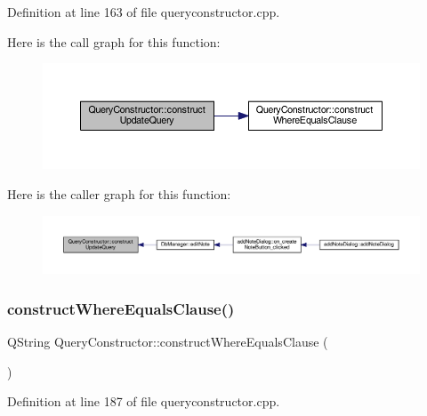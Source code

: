 Definition at line 163 of file queryconstructor.\+cpp.

Here is the call graph for this function\+:
\nopagebreak
\begin{figure}[H]
\begin{center}
\leavevmode
\includegraphics[width=350pt]{classQueryConstructor_ab17ea91cdd25440b863775526018da22_cgraph}
\end{center}
\end{figure}
Here is the caller graph for this function\+:
\nopagebreak
\begin{figure}[H]
\begin{center}
\leavevmode
\includegraphics[width=350pt]{classQueryConstructor_ab17ea91cdd25440b863775526018da22_icgraph}
\end{center}
\end{figure}
\hypertarget{classQueryConstructor_a7c864e227c2e76cc40a887314d43a0fe}{}\label{classQueryConstructor_a7c864e227c2e76cc40a887314d43a0fe} 
\subsubsection{\texorpdfstring{construct\+Where\+Equals\+Clause()}{constructWhereEqualsClause()}}
{\footnotesize\ttfamily Q\+String Query\+Constructor\+::construct\+Where\+Equals\+Clause (\begin{DoxyParamCaption}{ }\end{DoxyParamCaption})\hspace{0.3cm}{\ttfamily [private]}}



Definition at line 187 of file queryconstructor.\+cpp.

